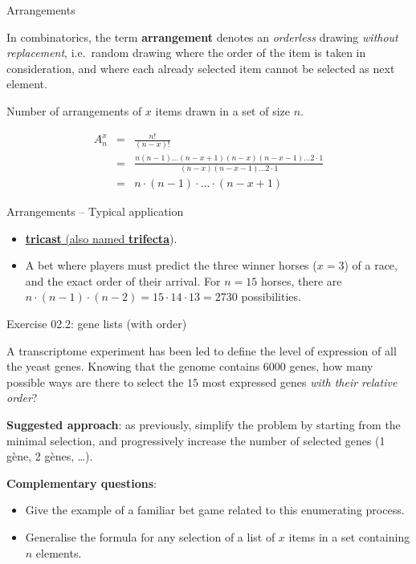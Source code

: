 \documentclass[ignorenonframetext,]{beamer}
\providecommand{\tightlist}{%
  \setlength{\itemsep}{0pt}\setlength{\parskip}{0pt}}
\begin{document}
\begin{frame}{Arrangements}
\protect\hypertarget{arrangements}{}

In combinatorics, the term \textbf{arrangement} denotes an
\emph{orderless} drawing \emph{without replacement}, i.e.~random drawing
where the order of the item is taken in consideration, and where each
already selected item cannot be selected as next element.

Number of arrangements of \(x\) items drawn in a set of size \(n\).

\[\begin{array}{ccl}
A^x_n & = & \frac{n!}{(n - x)!} \\
 & = & \frac{n(n-1) \ldots (n-x +1) (n - x) (n-x-1) \ldots 2 \cdot 1}{(n - x) (n-x-1) \ldots 2 \cdot 1} \\
& = & n \cdot (n-1) \cdot \ldots \cdot (n-x+1)
\end{array}
\]

\end{frame}

\begin{frame}{Arrangements -- Typical application}
\protect\hypertarget{arrangements-typical-application}{}

\begin{itemize}
\item
  \href{https://en.wikipedia.org/wiki/Trifecta}{\textbf{tricast} (also
  named \textbf{trifecta}}).
\item
  A bet where players must predict the three winner horses (\(x=3\)) of
  a race, and the exact order of their arrival. For \(n=15\) horses,
  there are \(n \cdot (n-1) \cdot (n-2) = 15 \cdot 14 \cdot 13 = 2730\)
  possibilities.
\end{itemize}

\end{frame}

\begin{frame}{Exercise 02.2: gene lists (with order)}
\protect\hypertarget{exercise-02.2-gene-lists-with-order}{}

A transcriptome experiment has been led to define the level of
expression of all the yeast genes. Knowing that the genome contains
\(6000\) genes, how many possible ways are there to select the \(15\)
most expressed genes \emph{with their relative order}?

\textbf{Suggested approach}: as previously, simplify the problem by
starting from the minimal selection, and progressively increase the
number of selected genes (1 gène, 2 gènes, \ldots{}).

\textbf{Complementary questions}:

\begin{itemize}
\tightlist
\item
  Give the example of a familiar bet game related to this enumerating
  process.
\item
  Generalise the formula for any selection of a list of \(x\) items in a
  set containing \(n\) elements.
\end{itemize}

\end{frame}
\end{document}
